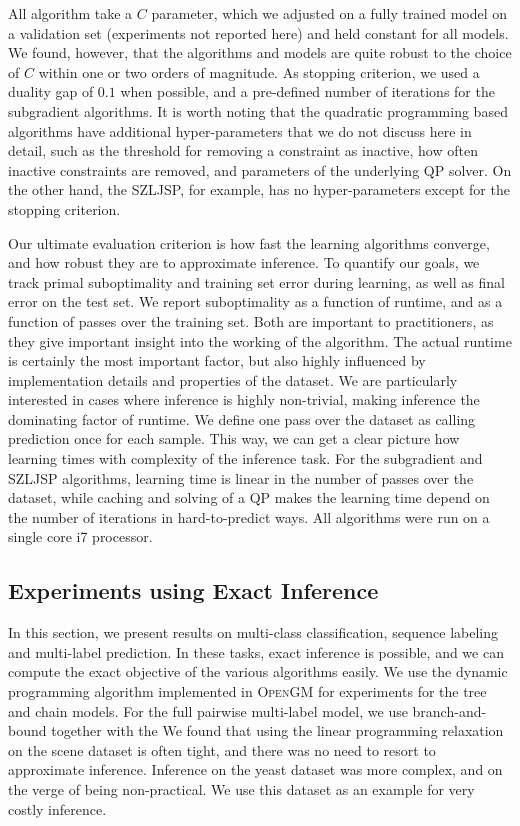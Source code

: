 All algorithm take a $C$ parameter, which we adjusted on a fully trained model
on a validation set (experiments not reported here) and held constant for all
models.  We found, however, that the algorithms and models are quite robust to
the choice of $C$ within one or two orders of magnitude.
As stopping criterion, we used a duality gap of $0.1$ when possible, and a
pre-defined number of iterations for the subgradient algorithms. It is worth
noting that the quadratic programming based algorithms have additional
hyper-parameters that we do not discuss here in detail, such as the threshold
for removing a constraint as inactive, how often inactive constraints are
removed, and parameters of the underlying QP solver. On the other hand, the
SZLJSP, for example, has no hyper-parameters except for the stopping criterion.

Our ultimate evaluation criterion is how fast the learning algorithms converge,
and how robust they are to approximate inference.  To quantify our goals, we
track primal suboptimality and training set error during learning, as well as
final error on the test set.
We report suboptimality as a function of runtime, and as a function of passes
over the training set.  Both are important to practitioners, as they give
important insight into the working of the algorithm.  The actual runtime is
certainly the most important factor, but also highly influenced by
implementation details and properties of the dataset. We are particularly
interested in cases where inference is highly non-trivial, making inference the
dominating factor of runtime.
We define one pass over the dataset as calling prediction once for each sample.
This way, we can get a clear picture how learning times with complexity of the
inference task. For the subgradient and SZLJSP algorithms, learning time is linear
in the number of passes over the dataset, while caching and solving of a QP makes
the learning time depend on the number of iterations in hard-to-predict ways.
All algorithms were run on a single core i7 processor.

\subsection{Experiments using Exact Inference}
In this section, we present results on multi-class classification, sequence
labeling and multi-label prediction. In these tasks, exact inference is
possible, and we can compute the exact objective of the various algorithms
easily. We use the dynamic programming algorithm implemented in \textsc{OpenGM}
for experiments for the tree and chain models.
For the full pairwise multi-label model, we use branch-and-bound together with the %
We found that using the linear programming relaxation on the scene dataset is
often tight, and there was no need to resort to approximate inference. Inference
on the yeast dataset was more complex, and on the verge of being non-practical.
We use this dataset as an example for very costly inference.

